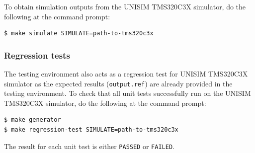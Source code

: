 \vspace{0.5cm}

To obtain simulation outputs from the UNISIM TMS320C3X simulator, do the following at the command prompt:
\begin{verbatim}
$ make simulate SIMULATE=path-to-tms320c3x
\end{verbatim}

\subsubsection{Regression tests}

The testing environment also acts as a regression test for UNISIM TMS320C3X simulator as the expected results (\texttt{output.ref}) are already provided in the testing environment.
To check that all unit tests successfully run on the UNISIM TMS320C3X simulator, do the following at the command prompt:
\begin{verbatim}
$ make generator
$ make regression-test SIMULATE=path-to-tms320c3x
\end{verbatim}

\noindent The result for each unit test is either \texttt{PASSED} or \texttt{FAILED}.\\
